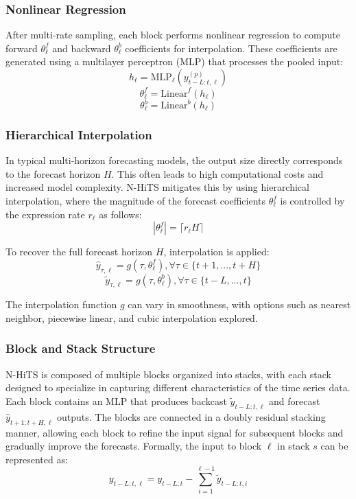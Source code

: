 \documentclass{ieeeojies}
\begin{document}
\subsubsection{Nonlinear Regression}

After multi-rate sampling, each block performs nonlinear regression to compute forward \( \theta^f_\ell \) and backward \( \theta^b_\ell \) coefficients for interpolation. These coefficients are generated using a multilayer perceptron (MLP) that processes the pooled input:
\[
h_\ell = \text{MLP}_\ell(y^{(p)}_{t-L:t,\ell})
\]
\[
\theta^f_\ell = \text{Linear}^f(h_\ell)
\]
\[
\theta^b_\ell = \text{Linear}^b(h_\ell)
\]

\subsubsection{Hierarchical Interpolation}

In typical multi-horizon forecasting models, the output size directly corresponds to the forecast horizon \( H \). This often leads to high computational costs and increased model complexity. N-HiTS mitigates this by using hierarchical interpolation, where the magnitude of the forecast coefficients \( \theta^f_\ell \) is controlled by the expression rate \( r_\ell \) as follows:
\[
|\theta^f_\ell| = \lceil r_\ell H \rceil
\]

To recover the full forecast horizon \( H \), interpolation is applied:
\[
\hat{y}_{\tau,\ell} = g(\tau, \theta^f_\ell), \forall \tau \in \{t+1, ..., t+H\}
\]
\[
\tilde{y}_{\tau,\ell} = g(\tau, \theta^b_\ell), \forall \tau \in \{t-L, ..., t\}
\]

The interpolation function \( g \) can vary in smoothness, with options such as nearest neighbor, piecewise linear, and cubic interpolation explored.

\subsubsection{Block and Stack Structure}

N-HiTS is composed of multiple blocks organized into stacks, with each stack designed to specialize in capturing different characteristics of the time series data. Each block contains an MLP that produces backcast \( \tilde{y}_{t-L:t,\ell} \) and forecast \( \hat{y}_{t+1:t+H,\ell} \) outputs. The blocks are connected in a doubly residual stacking manner, allowing each block to refine the input signal for subsequent blocks and gradually improve the forecasts.
Formally, the input to block \( \ell \) in stack \( s \) can be represented as:
\[
y_{t-L:t,\ell} = y_{t-L:t} - \sum_{i=1}^{\ell-1} \tilde{y}_{t-L:t,i}
\]
\end{document}
